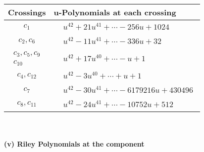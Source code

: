\documentclass[1p]{elsarticle_modified}
\theoremstyle{definition}
\begin{document}
\begin{tabular}{m{50pt}|m{274pt}}
Crossings & \hspace{64pt}u-Polynomials at each crossing \\
\hline $$\begin{aligned}c_{1}\end{aligned}$$&$\begin{aligned}
&u^{42}+21 u^{41}+\cdots-256 u+1024
\end{aligned}$\\
\hline $$\begin{aligned}c_{2},c_{6}\end{aligned}$$&$\begin{aligned}
&u^{42}-11 u^{41}+\cdots-336 u+32
\end{aligned}$\\
\hline $$\begin{aligned}c_{3},c_{5},c_{9}\\c_{10}\end{aligned}$$&$\begin{aligned}
&u^{42}+17 u^{40}+\cdots- u+1
\end{aligned}$\\
\hline $$\begin{aligned}c_{4},c_{12}\end{aligned}$$&$\begin{aligned}
&u^{42}-3 u^{40}+\cdots+u+1
\end{aligned}$\\
\hline $$\begin{aligned}c_{7}\end{aligned}$$&$\begin{aligned}
&u^{42}-30 u^{41}+\cdots-6179216 u+430496
\end{aligned}$\\
\hline $$\begin{aligned}c_{8},c_{11}\end{aligned}$$&$\begin{aligned}
&u^{42}-24 u^{41}+\cdots-10752 u+512
\end{aligned}$\\
\hline
\end{tabular}\\~\\
\newpage\renewcommand{\arraystretch}{1}
\flushleft \textbf{(v) Riley Polynomials at the component}\newline \\
\end{document}
